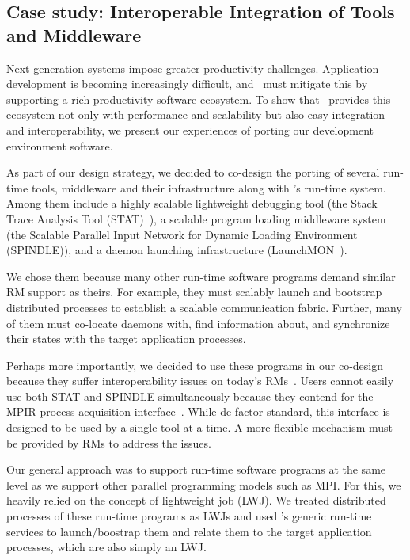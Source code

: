 \subsection{Case study: Interoperable Integration of Tools and Middleware}
\label{case}
Next-generation systems impose greater productivity
challenges. Application development is 
becoming increasingly difficult, and \flux\
must mitigate this by supporting a rich 
productivity software ecosystem. 
To show that \flux\ provides this ecosystem 
not only with performance and scalability
but also easy integration and interoperability,
we present our experiences of porting our development 
environment software. 

As part of our design strategy, we decided to 
co-design the porting of several run-time tools, middleware 
and their infrastructure along with \flux's run-time system. 
Among them include a highly scalable lightweight debugging tool
(the Stack Trace Analysis Tool (STAT)~\cite{STAT}),
a scalable program loading middleware system (the 
Scalable Parallel Input Network for Dynamic 
Loading Environment (SPINDLE)),
and a daemon launching infrastructure (LaunchMON~\cite{launchmon}). 

We chose them because many other run-time software
programs demand similar RM support as theirs.
For example, they must scalably launch and bootstrap 
distributed processes to establish a scalable 
communication fabric. 
Further, many of them must co-locate daemons with, 
find information about, and synchronize their states with 
the target application processes.

Perhaps more importantly, we decided to use these programs
in our co-design because they suffer interoperability issues on 
today's RMs~\cite{Jette02slurm,ALPS,BGQRes,Castain05theopen}.
Users cannot easily use both STAT
and SPINDLE simultaneously because they contend for
the MPIR process acquisition interface~\cite{MPIRInterface}.
While de factor standard, this interface is designed 
to be used by a single tool at a time. 
A more flexible mechanism must be provided by RMs
to address the issues.

Our general approach was to support run-time software programs 
at the same level as we support other parallel programming 
models such as MPI. For this, we heavily relied on the concept of lightweight 
job (LWJ). We treated 
distributed processes of these run-time programs
as LWJs and used \flux's 
generic run-time services to launch/boostrap them and 
relate them to the target application processes,
which are also simply an LWJ.


